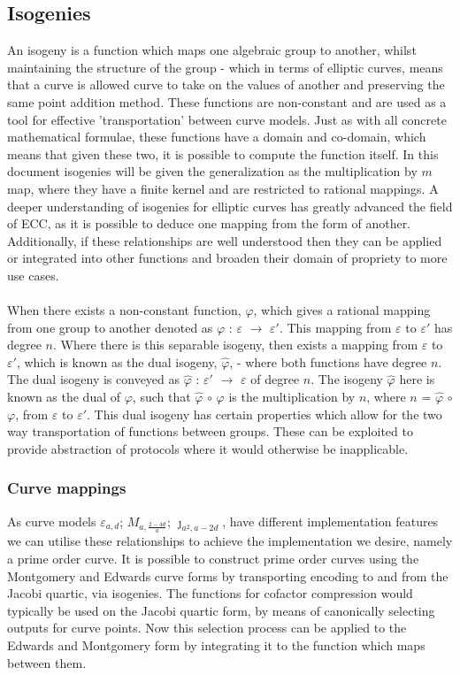 \documentclass{article}
\begin{document}
\subsection{Isogenies}
An isogeny is a function which maps one algebraic group to another, whilst maintaining the structure of the group - which in terms of elliptic curves, means that a curve is allowed curve to take on the values of another and preserving the same point addition method. These functions are non-constant and are used as a tool for effective 'transportation' between curve models. Just as with all concrete mathematical formulae, these functions have a domain and co-domain, which means that given these two, it is possible to compute the function itself. In this document isogenies will be given the generalization as the multiplication by $m$ map, where they have a finite kernel and are restricted to rational mappings.  
A deeper understanding of isogenies for elliptic curves has greatly advanced the field of ECC, as it is possible to deduce one mapping from the form of another. Additionally, if these relationships are well understood then they can be applied or integrated into other functions and broaden their domain of propriety to more use cases.\\\\
When there exists a non-constant function, $\varphi$, which gives a rational mapping from one group to another denoted as $\varphi$ : $\varepsilon$ $\rightarrow$ $\varepsilon\prime$. This mapping from $\varepsilon$ to $\varepsilon\prime$ has degree $n$. Where there is this separable isogeny, then exists a mapping from $\varepsilon$ to $\varepsilon\prime$, which is known as the dual isogeny, $\hat{\varphi}$, - where both functions have degree $n$. The dual isogeny is conveyed as $\hat{\varphi}$ : $\varepsilon\prime$ $\rightarrow$ $\varepsilon$ of degree $n$. The isogeny $\hat{\varphi}$ here is known as the dual of $\varphi$, such that $\hat{\varphi}$ $\circ$ $\varphi$ is the multiplication by $n$, where $n$ = $\hat{\varphi}$ $\circ$ $\varphi$, from $\varepsilon$ to $\varepsilon\prime$. This dual isogeny has certain properties which allow for the two way transportation of functions between groups. These can be exploited to provide abstraction of protocols where it would otherwise be inapplicable.

\subsubsection {Curve mappings}
As curve models $\varepsilon_{a,d}$; ${M}_{a,\frac{2-4d}{a}}$; $\jmath_{a^{2},a-{2d}}$, have different implementation features we can utilise these relationships to achieve the implementation we desire, namely a prime order curve. It is possible to construct prime order curves using the Montgomery and Edwards curve forms by transporting encoding to and from the Jacobi quartic, via isogenies. The functions for cofactor compression would typically be used on the Jacobi quartic form, by means of canonically selecting outputs for curve points. Now this selection process can be applied to the Edwards and Montgomery form by integrating it to the function which maps between them. \\\\ 
\end{document}
